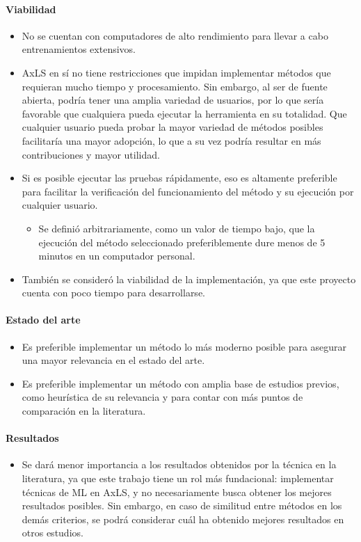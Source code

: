 \paragraph{Viabilidad}
\begin{itemize}
  \item No se cuentan con computadores de alto rendimiento para llevar a cabo
    entrenamientos extensivos.
  \item AxLS en sí no tiene restricciones que impidan implementar métodos que
    requieran mucho tiempo y procesamiento. Sin embargo, al ser de fuente abierta, podría tener una amplia variedad de usuarios, por lo que sería
    favorable que cualquiera pueda ejecutar la herramienta en su totalidad.
    Que cualquier usuario pueda probar la mayor variedad de métodos posibles
    facilitaría una mayor adopción, lo que a su vez podría resultar en más
    contribuciones y mayor utilidad.
  \item Si es posible ejecutar las pruebas rápidamente, eso es altamente
    preferible para facilitar la verificación del funcionamiento del método
    y su ejecución por cualquier usuario.
    \begin{itemize}
      \item Se definió arbitrariamente, como un valor de tiempo bajo, que la
        ejecución del método seleccionado preferiblemente dure menos de 5
        minutos en un computador personal.
    \end{itemize}

  \item También se consideró la viabilidad de la implementación, ya que este
    proyecto cuenta con poco tiempo para desarrollarse.
\end{itemize}

\paragraph{Estado del arte}
\begin{itemize}
  \item Es preferible implementar un método lo más moderno posible para
    asegurar una mayor relevancia en el estado del arte.

  \item Es preferible implementar un método con amplia base de estudios
    previos, como heurística de su relevancia y para contar con más puntos de
    comparación en la literatura.
\end{itemize}

\paragraph{Resultados}
\begin{itemize}
  \item Se dará menor importancia a los resultados obtenidos por la técnica
    en la literatura, ya que este trabajo tiene un rol más fundacional:
    implementar técnicas de ML en AxLS, y no necesariamente busca obtener los
    mejores resultados posibles. Sin embargo, en caso de similitud entre
    métodos en los demás criterios, se podrá considerar cuál ha obtenido
    mejores resultados en otros estudios.
\end{itemize}


